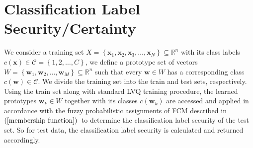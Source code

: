 
\section{Classification Label Security/Certainty}

We consider a training set\hspace{2pt} $X=\left\lbrace \mathbf{x}_1,\mathbf{x}_2,\mathbf{x}_3,\ldots,\mathbf{x}_N\right\rbrace \subseteq \mathbb{R}^n$\hspace{2pt} with its class labels\hspace{2pt} $c\left( \mathbf{x}\right)\in\mathcal{C}=\left\lbrace 1,2,\ldots, C\right\rbrace $,\hspace{2pt} we define a prototype set of vectors\hspace{2pt} $W=\left\lbrace \mathbf{w}_1,\mathbf{w}_2,\ldots,\mathbf{w}_M\right\rbrace\subseteq \mathbb{R}^n $\hspace{2pt} such that every\hspace{2pt} $\mathbf{w}\in W$ \hspace{2pt}has a corresponding class \hspace{2pt}$c\left( \mathbf{w}\right)\in\mathcal{C}$.\hspace{2pt} We divide the training set into the train and test sets, respectively. Using the train set along with standard LVQ training procedure, the learned prototypes \hspace{2pt}$\mathbf{w}_{k}\in W$ \hspace{2pt}together with its classes \hspace{2pt}$c\left( \mathbf{w}_{k} \right) $ \hspace{2pt} are accessed and applied in accordance with the fuzzy probabilistic assignments of FCM described in $\left( \ref{membership function}\right) $\ to determine the classification label security of the test set. So for test data, the classification label security is calculated and returned accordingly. 

